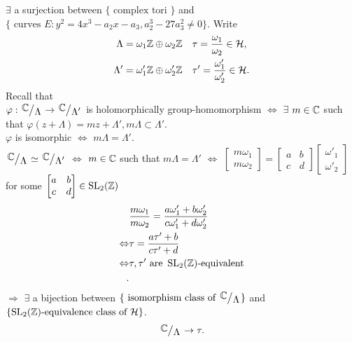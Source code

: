 \begin{remark}
  $\exists$ a surjection between $\{ \text{ complex tori }\} $ and $\{\text{ curves }E:y^2=4x^3-a_2x-a_3,a_2^3-27a_3^2\neq 0\} $.
  Write 
   \begin{align*}
     \Lambda=\omega_1\mathbb{Z}\oplus \omega_2\mathbb{Z} & \quad \tau= \frac{\omega_1}{\omega_2}\in \mathcal{H},\\
     \Lambda'=\omega_1'\mathbb{Z}\oplus \omega_2'\mathbb{Z} &\quad \tau'=\frac{\omega_1'}{\omega_2'}\in \mathcal{H}.
  \end{align*}
  Recall that\\
  $\varphi:\sfrac{\C}{\Lambda}\to \sfrac{\C}{\Lambda'}$ is holomorphically group-homomorphism $\Leftrightarrow$ $\exists$ $m\in \mathbb{C}$ such that $\varphi(z+\Lambda)=mz+\Lambda',m \Lambda\subset \Lambda'$.\\
  $\varphi$ is isomorphic $\Leftrightarrow$ $m\Lambda=\Lambda'$.\\
  $\sfrac{\C}{\Lambda}\simeq \sfrac{\C}{\Lambda'}$ $\Leftrightarrow$ $m\in \mathbb{C}$ such that $m\Lambda=\Lambda'$ $\Leftrightarrow$ $\begin{bmatrix} m\omega_1\\m\omega_2 \end{bmatrix} =\begin{bmatrix} a&b\\c&d \end{bmatrix} \begin{bmatrix} \omega'_1\\\omega'_2 \end{bmatrix} $ for some $\begin{bmatrix} a&b\\c&d \end{bmatrix} \in \operatorname{SL}_2(\mathbb{Z})$
  \begin{align*}
    & \frac{m\omega_1}{m\omega_2}=\frac{a\omega_1'+b\omega_2'}{c\omega_1'+d\omega_2'}\\
    \Leftrightarrow & \tau = \frac{a\tau'+b}{c\tau'+d}\\
    \Leftrightarrow &\tau,\tau' \text{ are } \operatorname{SL}_2(\mathbb{Z})\text{-equivalent}\\
  .\end{align*}
$\Rightarrow$ $\exists$ a bijection between
$\{\text{ isomorphism class of }\sfrac{\C}{\Lambda}\} $ and $\{\operatorname{SL}_2(\mathbb{Z})\text{-equivalence class of }\mathcal{H}\} $.
\[
\sfrac{\C}{\Lambda}\to \tau.
\] 
\end{remark}

